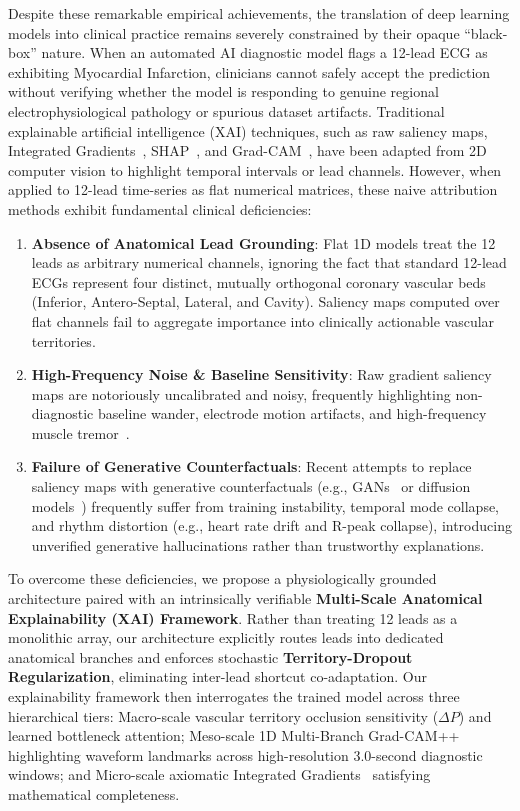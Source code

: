 \documentclass[5p,twocolumn,10pt]{elsarticle}
\begin{document}
Despite these remarkable empirical achievements, the translation of deep learning models into clinical practice remains severely constrained by their opaque ``black-box'' nature. When an automated AI diagnostic model flags a 12-lead ECG as exhibiting Myocardial Infarction, clinicians cannot safely accept the prediction without verifying whether the model is responding to genuine regional electrophysiological pathology or spurious dataset artifacts. Traditional explainable artificial intelligence (XAI) techniques, such as raw saliency maps, Integrated Gradients~\cite{sundararajan2017axiomatic}, SHAP~\cite{lundberg2017unified}, and Grad-CAM~\cite{selvaraju2017grad}, have been adapted from 2D computer vision to highlight temporal intervals or lead channels. However, when applied to 12-lead time-series as flat numerical matrices, these naive attribution methods exhibit fundamental clinical deficiencies:
\begin{enumerate}
    \item \textbf{Absence of Anatomical Lead Grounding}: Flat 1D models treat the 12 leads as arbitrary numerical channels, ignoring the fact that standard 12-lead ECGs represent four distinct, mutually orthogonal coronary vascular beds (Inferior, Antero-Septal, Lateral, and Cavity). Saliency maps computed over flat channels fail to aggregate importance into clinically actionable vascular territories.
    \item \textbf{High-Frequency Noise \& Baseline Sensitivity}: Raw gradient saliency maps are notoriously uncalibrated and noisy, frequently highlighting non-diagnostic baseline wander, electrode motion artifacts, and high-frequency muscle tremor~\cite{ismail2020benchmarking, tonekaboni2020went}.
    \item \textbf{Failure of Generative Counterfactuals}: Recent attempts to replace saliency maps with generative counterfactuals (e.g., GANs~\cite{korkmaz2021deep} or diffusion models~\cite{neifar2024diffecg}) frequently suffer from training instability, temporal mode collapse, and rhythm distortion (e.g., heart rate drift and R-peak collapse), introducing unverified generative hallucinations rather than trustworthy explanations.
\end{enumerate}

To overcome these deficiencies, we propose a physiologically grounded architecture paired with an intrinsically verifiable \textbf{Multi-Scale Anatomical Explainability (XAI) Framework}. Rather than treating 12 leads as a monolithic array, our architecture explicitly routes leads into dedicated anatomical branches and enforces stochastic \textbf{Territory-Dropout Regularization}, eliminating inter-lead shortcut co-adaptation. Our explainability framework then interrogates the trained model across three hierarchical tiers: Macro-scale vascular territory occlusion sensitivity ($\Delta P$) and learned bottleneck attention; Meso-scale 1D Multi-Branch Grad-CAM++~\cite{chattopadhay2018grad} highlighting waveform landmarks across high-resolution 3.0-second diagnostic windows; and Micro-scale axiomatic Integrated Gradients~\cite{sundararajan2017axiomatic} satisfying mathematical completeness.
\end{document}
